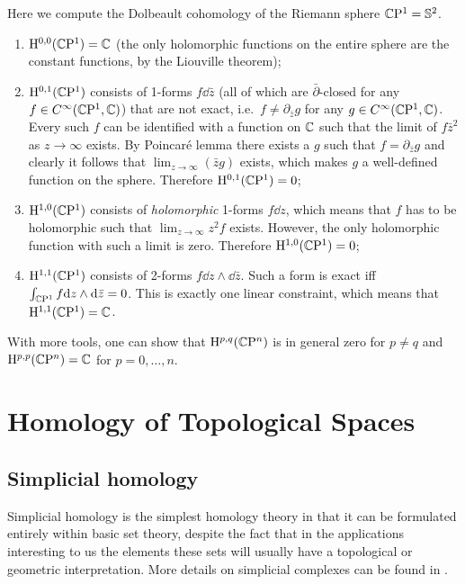 \begin{example}
    Here we compute the Dolbeault cohomology of the Riemann sphere $\mathbb{C}\mathrm{P}^1=\mathbb{S}^2$.
    \begin{enumerate}
        \item $\mathrm{H}^{0,0}(\mathbb{C}\mathrm{P}^1)=\mathbb{C}$ (the only holomorphic functions on the entire sphere are the constant functions, by the Liouville theorem);
        \item $\mathrm{H}^{0,1}(\mathbb{C}\mathrm{P}^1)$ consists of 1-forms $f\dd\bar z$ (all of which are $\bar\partial$-closed for any $f\in C^\infty(\mathbb{C}\mathrm{P}^1,\mathbb{C})$) that are not exact, i.e.\ $f\neq \partial_{\bar z} g$ for any $g\in C^\infty(\mathbb{C}\mathrm{P}^1,\mathbb{C})$. Every such $f$ can be identified with a function on $\mathbb{C}$ such that the limit of $f \bar z^2$ as $z\to\infty$ exists. By Poincar\'e lemma there exists a $g$ such that $f=\partial_{\bar z} g$ and clearly it follows that $\lim_{z\to\infty}(\bar zg)$ exists, which makes $g$ a well-defined function on the sphere. Therefore $\mathrm{H}^{0,1}(\mathbb{C}\mathrm{P}^1)=0$;
        \item $\mathrm{H}^{1,0}(\mathbb{C}\mathrm{P}^1)$ consists of \emph{holomorphic} 1-forms $f\dd z$, which means that $f$ has to be holomorphic such that $\lim_{z\to\infty}z^2f$ exists. However, the only holomorphic function with such a limit is zero. Therefore $\mathrm{H}^{1,0}(\mathbb{C}\mathrm{P}^1)=0$;
        \item $\mathrm{H}^{1,1}(\mathbb{C}\mathrm{P}^1)$ consists of 2-forms $f\dd z\wedge\dd\bar z$. Such a form is exact iff $\int_{\mathbb{C}\mathrm{P}^1}f{\mathrm{d}} z\wedge{\mathrm{d}} \bar z=0$. This is exactly one linear constraint, which means that $\mathrm{H}^{1,1}(\mathbb{C}\mathrm{P}^1)=\mathbb{C}$.
    \end{enumerate}
    With more tools, one can show that $\mathrm{H}^{p,q}(\mathbb{C}\mathrm{P}^n)$ is in general zero for $p\neq q$ and $\mathrm{H}^{p,p}(\mathbb{C}\mathrm{P}^n)=\mathbb{C}$ for $p=0,\ldots,n$.
\end{example}




\clearpage
\section{Homology of Topological Spaces}


\subsection{Simplicial homology}

Simplicial homology is the simplest homology theory in that it can be formulated entirely within basic set theory, despite the fact that in the applications interesting to us the elements these sets will usually have a topological or geometric interpretation. More details on simplicial complexes can be found in \cite{tomDieck}.


